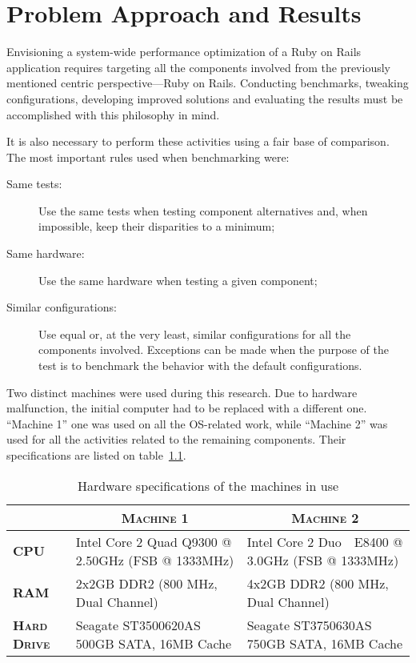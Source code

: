 \chapter{Problem Approach and Results} %
\label{cha:problem_approach_and_results}

Envisioning a system-wide performance optimization of a Ruby on Rails application requires targeting all the components involved from the previously mentioned centric perspective---Ruby on Rails. Conducting benchmarks, tweaking configurations, developing improved solutions and evaluating the results must be accomplished with this philosophy in mind. 

It is also necessary to perform these activities using a fair base of comparison. The most important rules used when benchmarking were:
\begin{description}
  \item[Same tests:] Use the same tests when testing component alternatives and, when impossible, keep their disparities to a minimum;
  \item[Same hardware:] Use the same hardware when testing a given component;
  \item[Similar configurations:] Use equal or, at the very least, similar configurations for all the components involved. Exceptions can be made when the purpose of the test is to benchmark the behavior with the default configurations.
\end{description}

Two distinct machines were used during this research. Due to hardware malfunction, the initial computer had to be replaced with a different one. ``Machine 1'' one was used on all the OS-related work, while ``Machine 2'' was used for all the activities related to the remaining components. Their specifications are listed on table~\ref{tab:machines_hardware_specification}.
\begin{table}[ht]
  \centering
  \caption{Hardware specifications of the machines in use}
  \label{tab:machines_hardware_specification}
  
  \begin{tabular}{p{}|p{}|p{}}
    & \multicolumn{1}{c|}{\textbf{\textsc{Machine 1}}} & \multicolumn{1}{c}{\textbf{\textsc{Machine 2}}} \\ \hline

    \textbf{\textsc{CPU}} & Intel Core 2 Quad Q9300 @ 2.50GHz (FSB @ 1333MHz) & Intel Core 2 Duo ~\,E8400 @ 3.0GHz (FSB @ 1333MHz) \\ \hline
    \textbf{\textsc{RAM}} & 2x2GB DDR2 (800 MHz, Dual Channel) & 4x2GB DDR2 (800 MHz, Dual Channel) \\ \hline
    \textbf{\textsc{Hard Drive}} & Seagate ST3500620AS 500GB SATA, 16MB Cache & Seagate ST3750630AS 750GB SATA, 16MB Cache \\
  
  \end{tabular}
\end{table}


